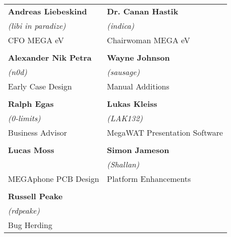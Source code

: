 \setlength{\tabcolsep}{1mm}
\begin{tabular}{p{6cm}p{6cm}}

{\large\bf Andreas Liebeskind}     & {\large\bf Dr. Canan Hastik} \\
 \textit{(libi in paradize)}       & \textit{(indica)} \\
CFO MEGA eV                        & Chairwoman MEGA eV \\
& \\
{\large\bf Alexander Nik Petra}    & {\large\bf Wayne Johnson} \\
 \textit{(n0d)}                    &  \textit{(sausage)} \\
Early Case Design                  & Manual Additions \\
& \\
{\large\bf Ralph Egas}             & {\large\bf Lukas Kleiss} \\
 \textit{(0-limits)}               & \textit{(LAK132)} \\
Business Advisor                   & MegaWAT Presentation Software \\
& \\
{\large\bf Lucas Moss}             & {\large\bf Simon Jameson} \\
                                   & \textit{(Shallan)} \\
MEGAphone PCB Design               & Platform Enhancements \\
& \\
{\large\bf Russell Peake}          &                           \\
  \textit{(rdpeake)}               &                    \\
Bug Herding                        &                       \\
\end{tabular}

\newpage
